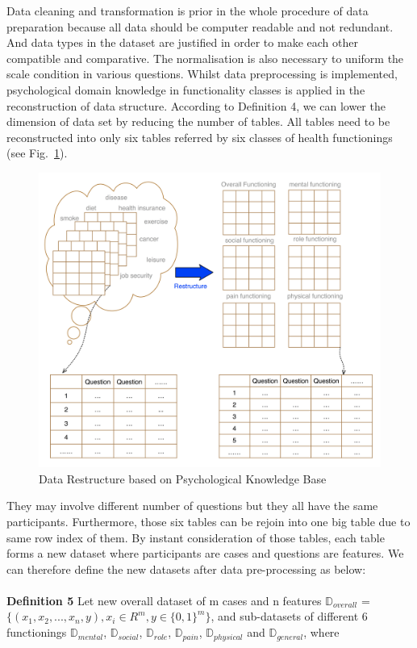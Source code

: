 \documentclass[runningheads]{llncs}
\begin{document}
Data cleaning and transformation is prior in the whole procedure of data preparation because all data should be computer readable and not redundant. And data types in the dataset are justified in order to make each other compatible and comparative. The normalisation is also necessary to uniform the scale condition in various questions. Whilst data preprocessing is implemented, psychological domain knowledge in functionality classes is applied in the reconstruction of data structure. According to Definition 4, we can lower the dimension of data set by reducing the number of tables. All tables need to be reconstructed into only six tables referred by six classes of health functionings (see Fig.~\ref{fig3}).
\begin{figure}[h]
\includegraphics[width=1\textwidth]{restructure.png}
\caption{Data Restructure based on Psychological Knowledge Base} \label{fig3}
\end{figure}
They may involve different number of questions but they all have the same participants. Furthermore, those six tables can be rejoin into one big table due to same row index of them. By instant consideration of those tables, each table forms a new dataset where participants are cases and questions are features. We can therefore define the new datasets after data pre-processing as below:\\
\\
\textbf{Definition 5} Let new overall dataset of m cases and n features $\mathbb{D}_{overall}$ = $\displaystyle \big\{ (x_{1}, x_{2}, ... , x_{n}, y ), x_{i} \in R^{m}, y \in {\{0, 1\}}^{m}  \big\}$, and sub-datasets of different 6 functionings $\mathbb{D}_{mental}$, $\mathbb{D}_{social}$, $\mathbb{D}_{role}$, $\mathbb{D}_{pain}$, $\mathbb{D}_{physical}$ and $\mathbb{D}_{general}$, where
\end{document}

